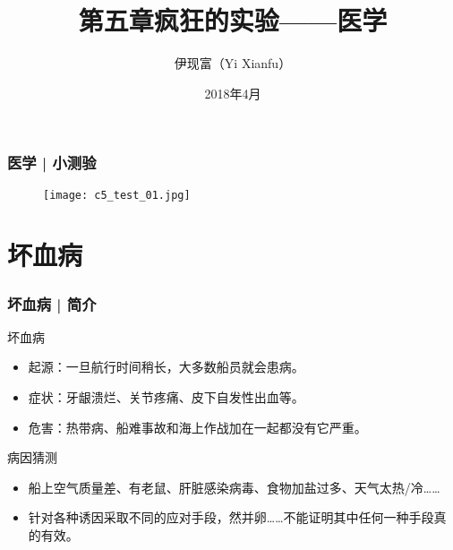 



\title[医学]{第五章\quad 疯狂的实验——医学}
\author[Yixf]{伊现富（Yi Xianfu）}
\date{2018年4月}



\begin{frame}
  \frametitle{医学 | 小测验}
  \begin{figure}
    \centering
    \texttt{[image: c5\_test\_01.jpg]}
  \end{figure}
\end{frame}

\section{坏血病}
\begin{frame}
  \frametitle{坏血病 | 简介}
  \begin{block}{坏血病}
    \begin{itemize}
      \item 起源：一旦航行时间稍长，大多数船员就会患病。
      \item 症状：牙龈溃烂、关节疼痛、皮下自发性出血等。
      \item 危害：热带病、船难事故和海上作战加在一起都没有它严重。
    \end{itemize}
  \end{block}
  \pause
  \begin{block}{病因猜测}
    \begin{itemize}
      \item 船上空气质量差、有老鼠、肝脏感染病毒、食物加盐过多、天气太热/冷……
      \item 针对各种诱因采取不同的应对手段，然并卵……不能证明其中任何一种手段真的有效。
    \end{itemize}
  \end{block}
\end{frame}

